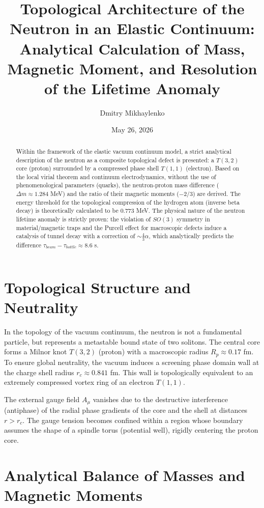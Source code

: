 \documentclass[12pt,a4paper]{article}
\title{Topological Architecture of the Neutron in an Elastic Continuum: Analytical Calculation of Mass, Magnetic Moment, and Resolution of the Lifetime Anomaly}
\author{Dmitry Mikhaylenko}
\date{May 26, 2026}
\begin{document}
\maketitle

\begin{abstract}
Within the framework of the elastic vacuum continuum model, a strict analytical description of the neutron as a composite topological defect is presented: a $T(3,2)$ core (proton) surrounded by a compressed phase shell $T(1,1)$ (electron). Based on the local virial theorem and continuum electrodynamics, without the use of phenomenological parameters (quarks), the neutron-proton mass difference ($\Delta m \approx 1.284$ MeV) and the ratio of their magnetic moments ($-2/3$) are derived. The energy threshold for the topological compression of the hydrogen atom (inverse beta decay) is theoretically calculated to be $0.773$ MeV. The physical nature of the neutron lifetime anomaly is strictly proven: the violation of $SO(3)$ symmetry in material/magnetic traps and the Purcell effect for macroscopic defects induce a catalysis of tunnel decay with a correction of $\sim \frac{4}{3}\alpha$, which analytically predicts the difference $\tau_{beam} - \tau_{bottle} \approx 8.6$ s.
\end{abstract}

\section{Topological Structure and Neutrality}

In the topology of the vacuum continuum, the neutron is not a fundamental particle, but represents a metastable bound state of two solitons. The central core forms a Milnor knot $T(3,2)$ (proton) with a macroscopic radius $R_p \approx 0.17$ fm. To ensure global neutrality, the vacuum induces a screening phase domain wall at the charge shell radius $r_c \approx 0.841$ fm. This wall is topologically equivalent to an extremely compressed vortex ring of an electron $T(1,1)$.

The external gauge field $A_\mu$ vanishes due to the destructive interference (antiphase) of the radial phase gradients of the core and the shell at distances $r > r_c$. The gauge tension becomes confined within a region whose boundary assumes the shape of a spindle torus (potential well), rigidly centering the proton core.

\section{Analytical Balance of Masses and Magnetic Moments}
\end{document}
